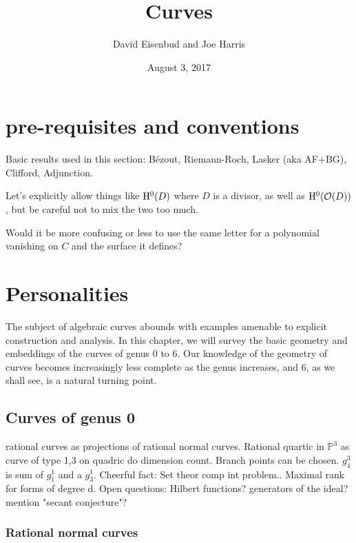 \documentclass[12pt, leqno]{article}
\date{August 3, 2017}
\title{Curves}
\author{David Eisenbud and Joe Harris }
\def\PP{{\mathbb P}}
\def\cO{{\cal O}}
\begin{document}
\maketitle

\setlength{\parskip}{5pt}

\section{pre-requisites and conventions}

Basic results used in this section: B\'ezout, Riemann-Roch, Lasker (aka AF+BG), Clifford, Adjunction.

Let's explicitly allow things like ${\rm{H}}^0(D)$ where $D$ is a divisor, as well as $\HH^0(\cO(D))$, but be careful not to mix the two too much.

Would it be more confusing or less to use the same letter for a polynomial vanishing on $C$ and the surface it defines?


\section{Personalities}

The subject of algebraic curves abounds with examples amenable to explicit construction and analysis. In this chapter, we will survey the basic geometry and embeddings of the curves of genus 0 to  6. Our knowledge of the geometry of curves becomes increasingly less complete as the genus increases, and 6, as we shall see, is a natural turning point. 

\subsection{Curves of genus 0} 

rational curves as projections of rational normal curves. Rational quartic in $\PP^3$ as curve of type 1,3 on quadric do dimension count. Branch points can be chosen. $g^3_4$ is sum of $g^1_1$ and a $g^1_3$. Cheerful fact: Set theor comp int problem.. Maximal rank for forms of degree d. Open questions: Hilbert functions? generators of the ideal? mention "secant conjecture"?

\subsubsection{Rational normal curves}
\end{document}
